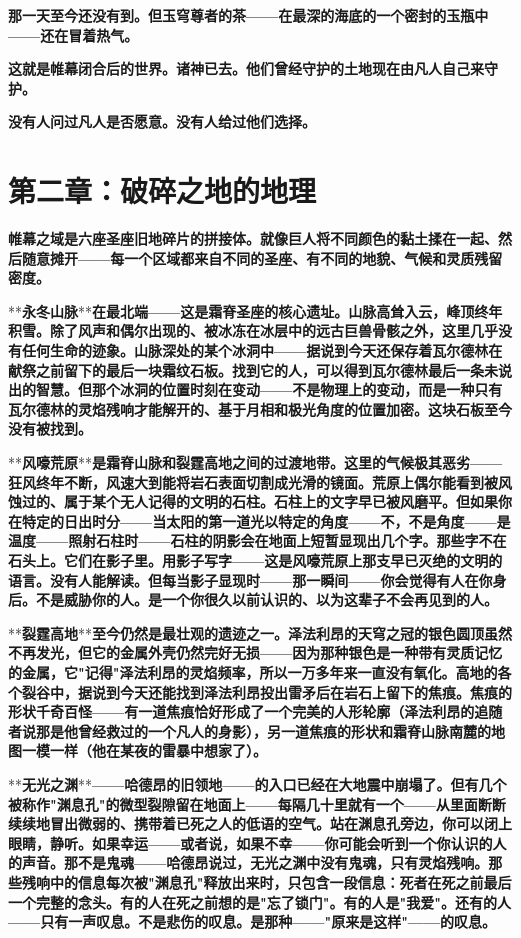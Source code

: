 \documentclass[12pt,a4paper,openany]{ctexbook}
\begin{document}
\textbf{那一天至今还没有到。但玉穹尊者的茶——在最深的海底的一个密封的玉瓶中——还在冒着热气。}


\textbf{这就是帷幕闭合后的世界。诸神已去。他们曾经守护的土地现在由凡人自己来守护。}


\textbf{没有人问过凡人是否愿意。没有人给过他们选择。}


\section*{第二章：破碎之地的地理}


\textbf{帷幕之域是六座圣座旧地碎片的拼接体。就像巨人将不同颜色的黏土揉在一起、然后随意摊开——每一个区域都来自不同的圣座、有不同的地貌、气候和灵质残留密度。}


**\textbf{永冬山脉}**\textbf{在最北端——这是霜脊圣座的核心遗址。山脉高耸入云，峰顶终年积雪。除了风声和偶尔出现的、被冰冻在冰层中的远古巨兽骨骸之外，这里几乎没有任何生命的迹象。山脉深处的某个冰洞中——据说到今天还保存着瓦尔德林在献祭之前留下的最后一块霜纹石板。找到它的人，可以得到瓦尔德林最后一条未说出的智慧。但那个冰洞的位置时刻在变动——不是物理上的变动，而是一种只有瓦尔德林的灵焰残响才能解开的、基于月相和极光角度的位置加密。这块石板至今没有被找到。}


**\textbf{风嚎荒原}**\textbf{是霜脊山脉和裂霆高地之间的过渡地带。这里的气候极其恶劣——狂风终年不断，风速大到能将岩石表面切割成光滑的镜面。荒原上偶尔能看到被风蚀过的、属于某个无人记得的文明的石柱。石柱上的文字早已被风磨平。但如果你在特定的日出时分——当太阳的第一道光以特定的角度——不，不是角度——是温度——照射石柱时——石柱的阴影会在地面上短暂显现出几个字。那些字不在石头上。它们在影子里。用影子写字——这是风嚎荒原上那支早已灭绝的文明的语言。没有人能解读。但每当影子显现时——那一瞬间——你会觉得有人在你身后。不是威胁你的人。是一个你很久以前认识的、以为这辈子不会再见到的人。}


**\textbf{裂霆高地}**\textbf{至今仍然是最壮观的遗迹之一。泽法利昂的天穹之冠的银色圆顶虽然不再发光，但它的金属外壳仍然完好无损——因为那种银色是一种带有灵质记忆的金属，它"记得"泽法利昂的灵焰频率，所以一万多年来一直没有氧化。高地的各个裂谷中，据说到今天还能找到泽法利昂投出雷矛后在岩石上留下的焦痕。焦痕的形状千奇百怪——有一道焦痕恰好形成了一个完美的人形轮廓（泽法利昂的追随者说那是他曾经救过的一个凡人的身影），另一道焦痕的形状和霜脊山脉南麓的地图一模一样（他在某夜的雷暴中想家了）。}


**\textbf{无光之渊}**\textbf{——哈德昂的旧领地——的入口已经在大地震中崩塌了。但有几个被称作"渊息孔"的微型裂隙留在地面上——每隔几十里就有一个——从里面断断续续地冒出微弱的、携带着已死之人的低语的空气。站在渊息孔旁边，你可以闭上眼睛，静听。如果幸运——或者说，如果不幸——你可能会听到一个你认识的人的声音。那不是鬼魂——哈德昂说过，无光之渊中没有鬼魂，只有灵焰残响。那些残响中的信息每次被"渊息孔"释放出来时，只包含一段信息：死者在死之前最后一个完整的念头。有的人在死之前想的是"忘了锁门"。有的人是"我爱"。还有的人——只有一声叹息。不是悲伤的叹息。是那种——"原来是这样"——的叹息。}
\end{document}
